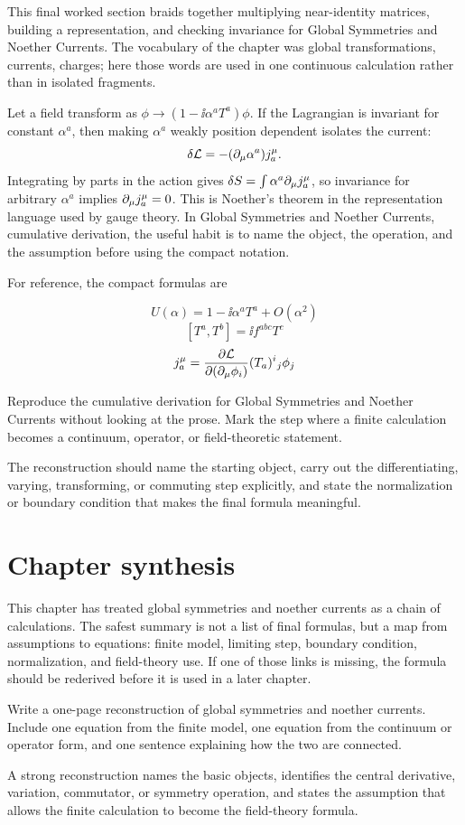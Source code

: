 This final worked section braids together multiplying near-identity matrices, building a representation, and checking invariance for Global Symmetries and Noether Currents.  The vocabulary of the chapter was global transformations, currents, charges; here those words are used in one continuous calculation rather than in isolated fragments.

Let a field transform as \(\phi\to (1-\ii\alpha^aT^a)\phi\).  If the Lagrangian is invariant for constant \(\alpha^a\), then making \(\alpha^a\) weakly position dependent isolates the current:
\[
  \delta\mathcal L=-(\partial_\mu\alpha^a)j^\mu_a.
\]
Integrating by parts in the action gives \(\delta S=\int\alpha^a\partial_\mu j^\mu_a\), so invariance for arbitrary \(\alpha^a\) implies \(\partial_\mu j^\mu_a=0\).  This is Noether's theorem in the representation language used by gauge theory.  In Global Symmetries and Noether Currents, cumulative derivation, the useful habit is to name the object, the operation, and the assumption before using the compact notation.

For reference, the compact formulas are

\[
  U(\alpha)=1-\ii\alpha^aT^a+O(\alpha^2)
\]
\[
  [T^a,T^b]=\ii f^{abc}T^c
\]
\[
  j^\mu_a=\frac{\partial\mathcal L}{\partial(\partial_\mu\phi_i)}(T_a)^i{}_j\phi_j
\]

\begin{exercise}
Reproduce the cumulative derivation for Global Symmetries and Noether Currents without looking at the prose.  Mark the step where a finite calculation becomes a continuum, operator, or field-theoretic statement.
\begin{answer}
The reconstruction should name the starting object, carry out the differentiating, varying, transforming, or commuting step explicitly, and state the normalization or boundary condition that makes the final formula meaningful.
\end{answer}
\end{exercise}



\section{Chapter synthesis}

This chapter has treated global symmetries and noether currents as a chain of calculations.  The safest summary is not a list of final formulas, but a map from assumptions to equations: finite model, limiting step, boundary condition, normalization, and field-theory use.  If one of those links is missing, the formula should be rederived before it is used in a later chapter.

\begin{exercise}
Write a one-page reconstruction of global symmetries and noether currents.  Include one equation from the finite model, one equation from the continuum or operator form, and one sentence explaining how the two are connected.
\begin{answer}
A strong reconstruction names the basic objects, identifies the central derivative, variation, commutator, or symmetry operation, and states the assumption that allows the finite calculation to become the field-theory formula.
\end{answer}
\end{exercise}
